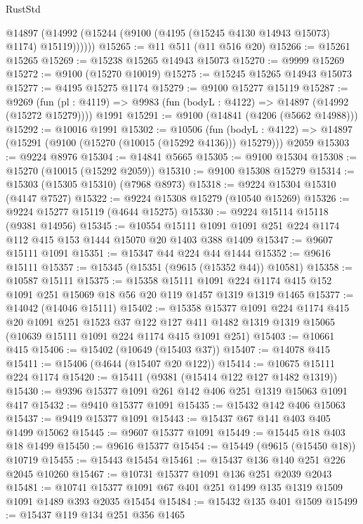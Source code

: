 \begin{lexlean}{RustStd}
\begin{coremodule}
        @14897 (@14992 (@15244 (@9100 (@4195 (@15245 @4130 @14943 @15073) @1174) @15119))))))
@15265 := @11 @511 (@11 @516 @20)
@15266 := @15261 @15265
@15269 := @15238 @15265 @14943 @15073
@15270 := @9999 @15269
@15272 := @9100 (@15270 @10019)
@15275 := @15245 @15265 @14943 @15073
@15277 := @4195 @15275 @1174
@15279 := @9100 @15277 @15119
@15287 := @9269
    (fun (pl : @4119) => @9983 (fun (bodyL : @4122) => @14897 (@14992 (@15272 @15279))))
    @1991
@15291 := @9100 (@14841 (@4206 (@5662 @14988)))
@15292 := @10016 @1991
@15302 := @10506
    (fun (bodyL : @4122) => @14897 (@15291 (@9100 (@15270 (@10015 (@15292 @4136))) @15279)))
    @2059
@15303 := @9224 @8976
@15304 := @14841 @5665
@15305 := @9100 @15304
@15308 := @15270 (@10015 (@15292 @2059))
@15310 := @9100 @15308 @15279
@15314 := @15303 (@15305 @15310) (@7968 @8973)
@15318 := @9224 @15304 @15310 (@4147 @7527)
@15322 := @9224 @15308 @15279 (@10540 @15269)
@15326 := @9224 @15277 @15119 (@4644 @15275)
@15330 := @9224 @15114 @15118 (@9381 @14956)
@15345 := @10554 @15111 @1091 @1091 @251 @224 @1174 @112 @415 @153 @1444 @15070 @20 @1403 @388 @1409
@15347 := @9607 @15111 @1091
@15351 := @15347 @44 @224 @44 @1444
@15352 := @9616 @15111
@15357 := @15345 (@15351 (@9615 (@15352 @44)) @10581)
@15358 := @10587 @15111
@15375 := @15358
    @15111
    @1091
    @224
    @1174
    @415
    @152
    @1091
    @251
    @15069
    @18
    @56
    @20
    @119
    @1457
    @1319
    @1319
    @1465
@15377 := @14042 (@14046 @15111)
@15402 := @15358
    @15377
    @1091
    @224
    @1174
    @415
    @20
    @1091
    @251
    @1523
    @37
    @122
    @127
    @411
    @1482
    @1319
    @1319
    @15065
    (@10639 @15111 @1091 @224 @1174 @415 @1091 @251)
@15403 := @10661 @415
@15406 := @15402 (@10649 (@15403 @37))
@15407 := @14078 @415
@15411 := @15406 (@4644 (@15407 @20 @122))
@15414 := @10675 @15111 @224 @1174
@15420 := @15411 (@9381 (@15414 @122 @127 @1482 @1319))
@15430 := @9396 @15377 @1091 @261 @142 @406 @251 @1319 @15063 @1091 @417
@15432 := @9410 @15377 @1091
@15435 := @15432 @142 @406 @15063
@15437 := @9419 @15377 @1091
@15443 := @15437 @67 @141 @403 @405 @1499 @15062
@15445 := @9607 @15377 @1091
@15449 := @15445 @18 @403 @18 @1499
@15450 := @9616 @15377
@15454 := @15449 (@9615 (@15450 @18)) @10719
@15455 := @15443 @15454
@15461 := @15437 @136 @140 @251 @226 @2045 @10260
@15467 := @10731 @15377 @1091 @136 @251 @2039 @2043
@15481 := @10741 @15377 @1091 @67 @401 @251 @1499 @135 @1319 @1509 @1091 @1489 @393 @2035 @15454
@15484 := @15432 @135 @401 @1509
@15499 := @15437
    @119
    @134
    @251
    @356
    @1465

\end{coremodule}
\end{lexlean}
